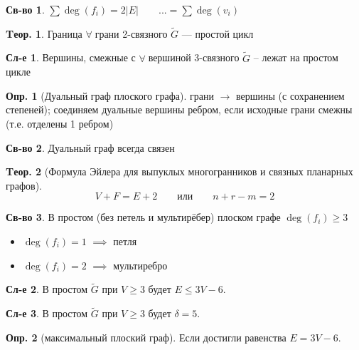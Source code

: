 \documentclass[a4paper,12pt]{article}
\numberwithin{figure}{section}
\theoremstyle{definition}
\newtheorem{definition}{Опр.}[section]
\newtheorem*{property}{Св-во}  %
\theoremstyle{definition}
\newtheorem{theorem}{Tеор.}[section]
\newtheorem*{corollary}{Сл-е} %
\def\iiany{$\forall\;$}
\begin{document}
\begin{property} $ \sum{\deg(f_i)} = 2|E| \qquad ... = \sum{\deg(v_i)}$ \end{property}

\begin{theorem}
	Граница \iiany грани 2-связного $\tilde{G}$ --- простой цикл
\end{theorem}

\begin{corollary}
	Вершины, смежные с \iiany вершиной 3-связного $\tilde{G}$ -- лежат на простом цикле
\end{corollary}

\begin{definition}[Дуальный граф плоского графа]
	грани $\longrightarrow$ вершины (с сохранением степеней); соединяем дуальные вершины ребром, если исходные грани смежны (т.е. отделены 1 ребром)
\end{definition}

\begin{property} Дуальный граф всегда связен \end{property}

\begin{theorem}[Формула Эйлера для выпуклых многогранников и связных планарных графов]
	\[ V+F = E+2 \qquad \text{или} \qquad n+r-m=2 \]
\end{theorem}

\begin{property}
	В простом (без петель и мультирёбер) плоском графе $\deg(f_i) \geqslant 3$
	\begin{itemize}
		\item $\deg(f_i)=1$ $\implies$ петля
		\item $\deg(f_i)=2$ $\implies$ мультиребро
	\end{itemize}
\end{property}

\begin{corollary}
	В простом $\tilde{G}$ при $V \geqslant 3$ будет $E \leqslant 3V-6$.
\end{corollary}

\begin{corollary}
	В простом $\tilde{G}$ при $V \geqslant 3$ будет $\delta=5$.
\end{corollary}

\begin{definition}[максимальный плоский граф]
	Если достигли равенства $E=3V-6$.
\end{definition}
\end{document}
